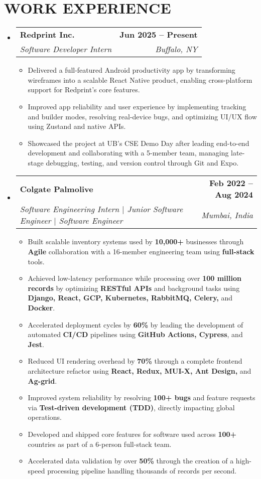 \documentclass[letterpaper,10pt]{article}
\makeatletter
\newcommand{\resumeItem}[1]{
  \item\small{
    {#1}
  }
}
\newcommand{\resumeSubheading}[4]{
  \item
    \begin{tabular*}{1.0\textwidth}[t]{l@{\extracolsep{\fill}}r}
      \textbf{\normalsize#1} & \textbf{\small#4} \\
      \textit{\normalsize#3} & \textit{\small#2}
    \end{tabular*}
}
\newcommand{\resumeSubHeadingListStart}{\begin{itemize}[leftmargin=0.0in, label={}]}
\newcommand{\resumeSubHeadingListEnd}{\end{itemize}}
\newcommand{\resumeItemListStart}{\begin{itemize}}
\newcommand{\resumeItemListEnd}{\end{itemize}}
\makeatother
\begin{document}
\section{WORK EXPERIENCE}
\resumeSubHeadingListStart
  \resumeSubheading{Redprint Inc.}{Buffalo, NY}
  {Software Developer Intern}{Jun 2025 -- Present}
  \resumeItemListStart
    \resumeItem{\normalsize{Delivered a full-featured Android productivity app by transforming wireframes into a scalable React Native product, enabling cross-platform support for Redprint's core features.}}
    \resumeItem{\normalsize{Improved app reliability and user experience by implementing tracking and builder modes, resolving real-device bugs, and optimizing UI/UX flow using Zustand and native APIs.}}
    \resumeItem{\normalsize{Showcased the project at UB’s CSE Demo Day after leading end-to-end development and collaborating with a 5-member team, managing late-stage debugging, testing, and version control through Git and Expo.}}
  \resumeItemListEnd
  \resumeSubheading{Colgate Palmolive}{Mumbai, India}
  {Software Engineering Intern $|$ Junior Software Engineer $|$ Software Engineer}{Feb 2022 -- Aug 2024}
  \resumeItemListStart
    \resumeItem{\normalsize{Built scalable inventory systems used by \textbf{10,000+} businesses through \textbf{Agile} collaboration with a 16-member engineering team using \textbf{full-stack} tools.}}
    \resumeItem{\normalsize{Achieved low-latency performance while processing over \textbf{100 million records} by optimizing \textbf{RESTful APIs} and background tasks using \textbf{Django, React, GCP, Kubernetes, RabbitMQ, Celery,} and \textbf{Docker}.}}
    \resumeItem{\normalsize{Accelerated deployment cycles by \textbf{60\%} by leading the development of automated \textbf{CI/CD} pipelines using \textbf{GitHub Actions, Cypress}, and \textbf{Jest}.}}
    \resumeItem{\normalsize{Reduced UI rendering overhead by \textbf{70\%} through a complete frontend architecture refactor using \textbf{React, Redux, MUI-X, Ant Design,} and \textbf{Ag-grid}.}}
    \resumeItem{\normalsize{Improved system reliability by resolving \textbf{100+ bugs} and feature requests via \textbf{Test-driven development (TDD)}, directly impacting global operations.}}
    \resumeItem{\normalsize{Developed and shipped core features for software used across \textbf{100+} countries as part of a 6-person full-stack team.}}
    \resumeItem{\normalsize{Accelerated data validation by over \textbf{50\%} through the creation of a high-speed processing pipeline handling thousands of records per second.}}
  \resumeItemListEnd
\resumeSubHeadingListEnd
\end{document}
